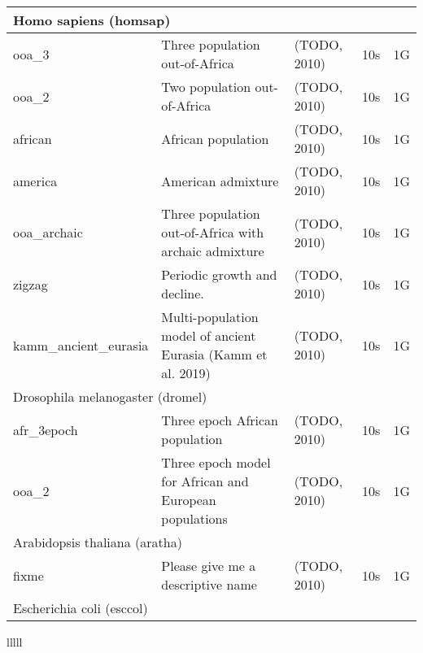 \begin{tabular}{lllll}
\hline
\multicolumn{5}{l}{ Homo sapiens (homsap) } \\
\hline
ooa\_3& Three population out-of-Africa& (TODO, 2010)& 10s& 1G \\
ooa\_2& Two population out-of-Africa& (TODO, 2010)& 10s& 1G \\
african& African population& (TODO, 2010)& 10s& 1G \\
america& American admixture& (TODO, 2010)& 10s& 1G \\
ooa\_archaic& Three population out-of-Africa with archaic admixture& (TODO, 2010)& 10s& 1G \\
zigzag& Periodic growth and decline.& (TODO, 2010)& 10s& 1G \\
kamm\_ancient\_eurasia& Multi-population model of ancient Eurasia (Kamm et al. 2019)& (TODO, 2010)& 10s& 1G \\
\hline
\multicolumn{5}{l}{ Drosophila melanogaster (dromel) } \\
\hline
afr\_3epoch& Three epoch African population& (TODO, 2010)& 10s& 1G \\
ooa\_2& Three epoch model for African and European populations& (TODO, 2010)& 10s& 1G \\
\hline
\multicolumn{5}{l}{ Arabidopsis thaliana (aratha) } \\
\hline
fixme& Please give me a descriptive name& (TODO, 2010)& 10s& 1G \\
\hline
\multicolumn{5}{l}{ Escherichia coli (esccol) } \\
\hline
\end{tabular}{lllll}
